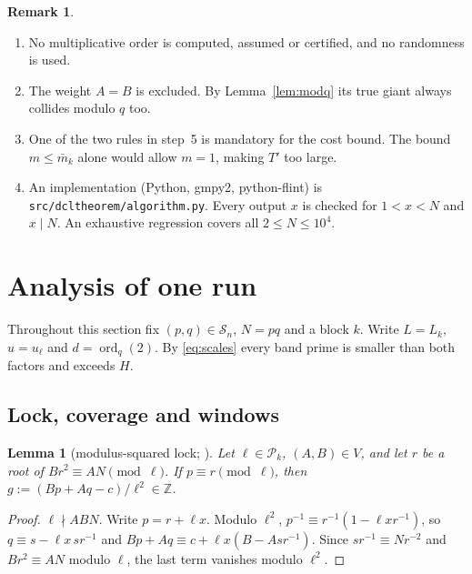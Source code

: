 \documentclass[11pt]{amsart}
\newtheorem{lemma}[theorem]{Lemma}
\theoremstyle{definition}
\newtheorem{remark}[theorem]{Remark}
\newcommand{\Z}{\mathbb{Z}}
\newcommand{\Sn}{\mathcal{S}_n}
\newcommand{\Pk}{\mathcal{P}_k}
\newcommand{\ord}{\operatorname{ord}}
\newcommand{\mbar}{\bar m_k}
\begin{document}
\begin{remark}\label{rem:alg}
\begin{enumerate}[label=(\alph*)]
\item No multiplicative order is computed, assumed or certified, and no randomness is used.
\item The weight $A=B$ is excluded. By Lemma~\ref{lem:modq} its true giant always collides
  modulo $q$ too.
\item One of the two rules in step~5 is mandatory for the cost bound. The bound $m\le\mbar$ alone
  would allow $m=1$, making $T'$ too large.
\item An implementation (Python, gmpy2, python-flint) is \texttt{src/dcltheorem/algorithm.py}.
  Every output $x$ is checked for $1<x<N$ and $x\mid N$. An exhaustive regression covers all
  $2\le N\le10^4$.
\end{enumerate}
\end{remark}

\section{Analysis of one run}\label{sec:onerun}

Throughout this section fix $(p,q)\in\Sn$, $N=pq$ and a block $k$. Write $L=L_k$, $u=u_\ell$ and
$d=\ord_q(2)$. By \eqref{eq:scales} every band prime is smaller than both factors and exceeds $H$.

\subsection{Lock, coverage and windows}

\begin{lemma}[modulus-squared lock; {\cite[Prop.~3.3]{hh2022}}]\label{lem:lock}
Let $\ell\in\Pk$, $(A,B)\in V$, and let $r$ be a root of $Br^2\equiv AN\pmod\ell$. If
$p\equiv r\pmod\ell$, then $g:=(Bp+Aq-c)/\ell^2\in\Z$.
\end{lemma}
\begin{proof}
$\ell\nmid ABN$. Write $p=r+\ell x$. Modulo $\ell^2$, $p^{-1}\equiv r^{-1}(1-\ell xr^{-1})$, so
$q\equiv s-\ell x\,sr^{-1}$ and $Bp+Aq\equiv c+\ell x(B-Asr^{-1})$. Since $sr^{-1}\equiv Nr^{-2}$
and $Br^2\equiv AN$ modulo $\ell$, the last term vanishes modulo $\ell^2$.
\end{proof}
\end{document}
